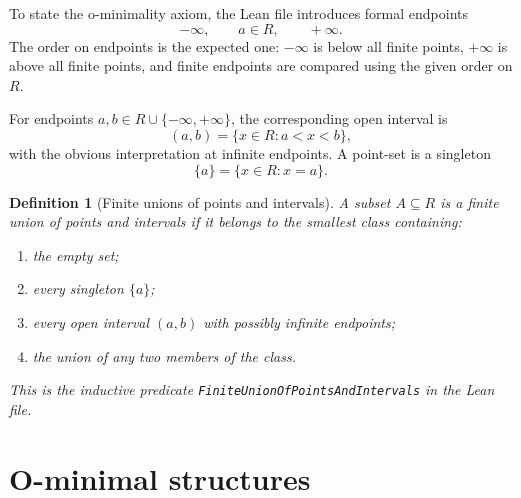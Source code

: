 \documentclass[11pt]{article}
\newtheorem{definition}{Definition}[section]
\begin{document}
To state the o-minimality axiom, the Lean file introduces formal endpoints
\[
  -\infty,\qquad a\in R,
  \qquad +\infty.
\]
The order on endpoints is the expected one: $-\infty$ is below all finite points, $+\infty$ is above all finite points, and finite endpoints are compared using the given order on $R$.

For endpoints $a,b\in R\cup\{-\infty,+\infty\}$, the corresponding open interval is
\[
  (a,b)=\{x\in R:a<x<b\},
\]
with the obvious interpretation at infinite endpoints.
A point-set is a singleton
\[
  \{a\}=\{x\in R:x=a\}.
\]

\begin{definition}[Finite unions of points and intervals]
A subset $A\subseteq R$ is a finite union of points and intervals if it belongs to the smallest class containing:
\begin{enumerate}[label=(\roman*)]
  \item the empty set;
  \item every singleton $\{a\}$;
  \item every open interval $(a,b)$ with possibly infinite endpoints;
  \item the union of any two members of the class.
\end{enumerate}
This is the inductive predicate \texttt{FiniteUnionOfPointsAndIntervals} in the Lean file.
\end{definition}

\section{O-minimal structures}
\end{document}
